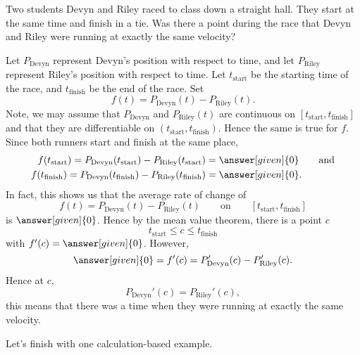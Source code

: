 \documentclass{ximera}
\begin{document}
\begin{example}
  Two students Devyn and Riley raced to class down a straight hall. They start at the same time and finish in a tie. Was there a point
  during the race that Devyn and Riley were running at exactly the
  same velocity?
  \begin{explanation}
    Let $P_\mathrm{Devyn}$ represent Devyn's position with respect to
    time, and let $P_\mathrm{Riley}$ represent Riley's position with
    respect to time. Let $t_\mathrm{start}$ be the starting time of
    the race, and $t_\mathrm{finish}$ be the end of the race. Set
    \[
    f(t) =P_\mathrm{Devyn}(t)-P_\mathrm{Riley}(t).
    \]
    Note, we may assume that $P_\mathrm{Devyn}$ and
    $P_\mathrm{Riley}(t)$ are continuous on
    $[t_\mathrm{start},t_\mathrm{finish}]$ and that they are
    differentiable on $(t_\mathrm{start},t_\mathrm{finish})$. Hence
    the same is true for $f$. Since both runners start and finish at
    the same place,
    \begin{align*}
    f(t_\mathrm{start}) = P_\mathrm{Devyn}(t_\mathrm{start})-P_\mathrm{Riley}(t_\mathrm{start}) &= \answer[given]{0}\qquad\text{and}\\
    f(t_\mathrm{finish})=P_\mathrm{Devyn}(t_\mathrm{finish})-P_\mathrm{Riley}(t_\mathrm{finish}) &= \answer[given]{0}.\\
    \end{align*}
    In fact, this shows us that the average rate of change of
    \[
    f(t) = P_\mathrm{Devyn}(t)-P_\mathrm{Riley}(t)
    \qquad\text{on}\qquad [t_\mathrm{start},t_\mathrm{finish}]
    \]
    is $\answer[given]{0}$. Hence by the mean value theorem, there is a point $c$
    \[
    t_\mathrm{start}\le c \le t_{\mathrm{finish}}
    \]
    with $f'(c) = \answer[given]{0}$. However,
    \[
    \answer[given]{0} = f'(c) = P_\mathrm{Devyn}'(c)-P_\mathrm{Riley}'(c).
    \]
    Hence at $c$,
    \[
    P_\mathrm{Devyn}'(c)=P_\mathrm{Riley}'(c),
    \]
    this means that there was a time when they were running at exactly the same velocity. 
  \end{explanation}
\end{example}

Let's finish with one calculation-based example.
\end{document}
